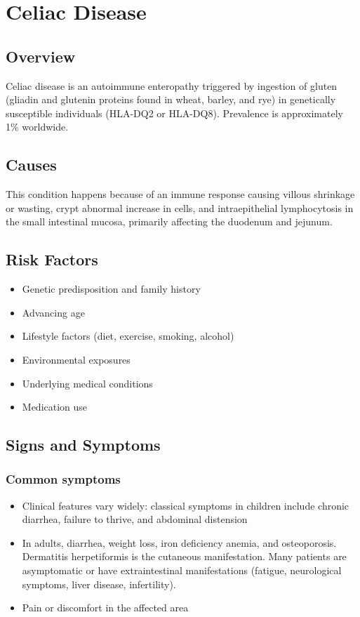 \chapter{Celiac Disease}
\label{sec:Celiac Disease}

\section{Overview}
Celiac disease is an autoimmune enteropathy triggered by ingestion of gluten (gliadin and glutenin proteins found in wheat, barley, and rye) in genetically susceptible individuals (HLA-DQ2 or HLA-DQ8). Prevalence is approximately 1\% worldwide.
\section{Causes}
This condition happens because of an immune response causing villous shrinkage or wasting, crypt abnormal increase in cells, and intraepithelial lymphocytosis in the small intestinal mucosa, primarily affecting the duodenum and jejunum.     
\section{Risk Factors}

\begin{itemize}[noitemsep]
  \item Genetic predisposition and family history
  \item Advancing age
  \item Lifestyle factors (diet, exercise, smoking, alcohol)
  \item Environmental exposures
  \item Underlying medical conditions
  \item Medication use
\end{itemize}
\section{Signs and Symptoms}

\subsection{Common symptoms}
\begin{itemize}[noitemsep]
  \item Clinical features vary widely: classical symptoms in children include chronic diarrhea, failure to thrive, and abdominal distension
  \item In adults, diarrhea, weight loss, iron deficiency anemia, and osteoporosis. Dermatitis herpetiformis is the cutaneous manifestation. Many patients are asymptomatic or have extraintestinal manifestations (fatigue, neurological symptoms, liver disease, infertility).
  \item Pain or discomfort in the affected area
  \end{itemize}

